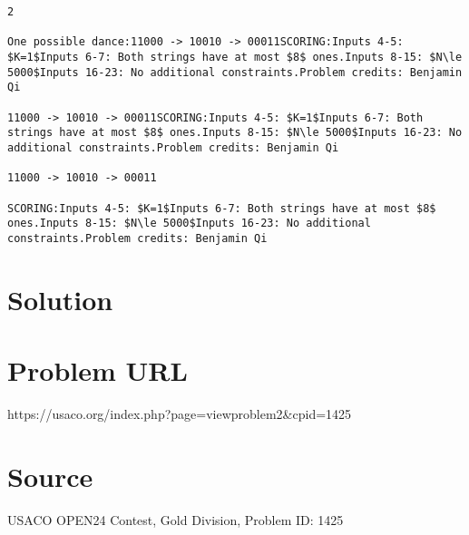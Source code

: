 \documentclass[12pt]{article}
\begin{document}
\begin{verbatim}
2

One possible dance:11000 -> 10010 -> 00011SCORING:Inputs 4-5: $K=1$Inputs 6-7: Both strings have at most $8$ ones.Inputs 8-15: $N\le 5000$Inputs 16-23: No additional constraints.Problem credits: Benjamin Qi

11000 -> 10010 -> 00011SCORING:Inputs 4-5: $K=1$Inputs 6-7: Both strings have at most $8$ ones.Inputs 8-15: $N\le 5000$Inputs 16-23: No additional constraints.Problem credits: Benjamin Qi

11000 -> 10010 -> 00011

SCORING:Inputs 4-5: $K=1$Inputs 6-7: Both strings have at most $8$ ones.Inputs 8-15: $N\le 5000$Inputs 16-23: No additional constraints.Problem credits: Benjamin Qi
\end{verbatim}

\section*{Solution}


\section*{Problem URL}
https://usaco.org/index.php?page=viewproblem2&cpid=1425

\section*{Source}
USACO OPEN24 Contest, Gold Division, Problem ID: 1425
\end{document}
